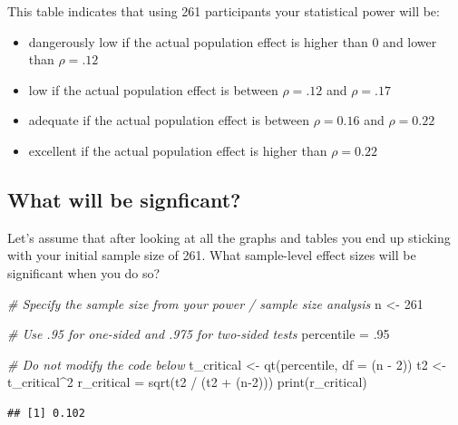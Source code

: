 \documentclass[
]{krantz}
\makeatletter
\newenvironment{Shaded}{\begin{snugshade}}{\end{snugshade}}
\newcommand{\AttributeTok}[1]{\textcolor[rgb]{0.61,0.61,0.61}{#1}}
\newcommand{\CommentTok}[1]{\textcolor[rgb]{0.37,0.37,0.37}{\textit{#1}}}
\newcommand{\DecValTok}[1]{\textcolor[rgb]{0.06,0.06,0.06}{#1}}
\newcommand{\FunctionTok}[1]{\textcolor[rgb]{0,0,0}{#1}}
\newcommand{\NormalTok}[1]{#1}
\newcommand{\OtherTok}[1]{\textcolor[rgb]{0.37,0.37,0.37}{#1}}
\newcommand{\SpecialCharTok}[1]{\textcolor[rgb]{0,0,0}{#1}}
\newenvironment{kframe}{%
\medskip{}
\setlength{\fboxsep}{.8em}
 \def\at@end@of@kframe{}%
 \ifinner\ifhmode%
  \def\at@end@of@kframe{\end{minipage}}%
  \begin{minipage}{\columnwidth}%
 \fi\fi%
 \def\FrameCommand##1{\hskip\@totalleftmargin \hskip-\fboxsep
 \colorbox{shadecolor}{##1}\hskip-\fboxsep
     \hskip-\linewidth \hskip-\@totalleftmargin \hskip\columnwidth}%
 \MakeFramed {\advance\hsize-\width
   \@totalleftmargin\z@ \linewidth\hsize
   \@setminipage}}%
 {\par\unskip\endMakeFramed%
 \at@end@of@kframe}
\renewenvironment{Shaded}{\begin{kframe}}{\end{kframe}}
\makeatother
\begin{document}
This table indicates that using 261 participants your statistical power will be:

\begin{itemize}
\item
  dangerously low if the actual population effect is higher than 0 and lower than \(\rho = .12\)
\item
  low if the actual population effect is between \(\rho = .12\) and \(\rho = .17\)
\item
  adequate if the actual population effect is between \(\rho = 0.16\) and \(\rho = 0.22\)
\item
  excellent if the actual population effect is higher than \(\rho = 0.22\)
\end{itemize}

\hypertarget{what-will-be-signficant-2}{%
\subsection{What will be signficant?}\label{what-will-be-signficant-2}}

Let's assume that after looking at all the graphs and tables you end up sticking with your initial sample size of 261. What sample-level effect sizes will be significant when you do so?

\begin{Shaded}
\begin{Highlighting}[]
\CommentTok{\# Specify the sample size from your power / sample size analysis}
\NormalTok{n }\OtherTok{\textless{}{-}} \DecValTok{261}

\CommentTok{\# Use .95 for one{-}sided and .975 for two{-}sided tests}
\NormalTok{percentile }\OtherTok{=}\NormalTok{ .}\DecValTok{95} 

\CommentTok{\# Do not modify the code below}
\NormalTok{t\_critical }\OtherTok{\textless{}{-}} \FunctionTok{qt}\NormalTok{(percentile, }\AttributeTok{df =}\NormalTok{ (n }\SpecialCharTok{{-}} \DecValTok{2}\NormalTok{))}
\NormalTok{t2 }\OtherTok{\textless{}{-}}\NormalTok{ t\_critical}\SpecialCharTok{\^{}}\DecValTok{2}
\NormalTok{r\_critical }\OtherTok{=} \FunctionTok{sqrt}\NormalTok{(t2 }\SpecialCharTok{/}\NormalTok{ (t2 }\SpecialCharTok{+}\NormalTok{ (n}\DecValTok{{-}2}\NormalTok{)))}
\FunctionTok{print}\NormalTok{(r\_critical)}
\end{Highlighting}
\end{Shaded}

\begin{verbatim}
## [1] 0.102
\end{verbatim}
\end{document}
